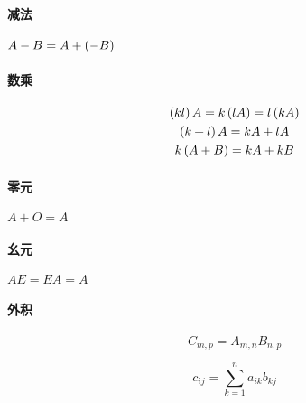 \documentclass{article}
\begin{document}
\paragraph{减法}$A-B=A+\left(-B\right)$

\paragraph{数乘}

\[\begin{gathered}
        \left(kl\right)A=k\left(lA\right)=l\left(kA\right)\\
        \left(k+l\right)A=kA+lA\\
        k\left(A+B\right)=kA+kB
    \end{gathered}\]

\paragraph{零元}$A+O=A$

\paragraph{幺元}$AE=EA=A$

\paragraph{外积}

\[C_{m,p}=A_{m,n}B_{n,p}\]

\[c_{ij}=\sum_{k=1}^na_{ik}b_{kj}\]
\end{document}
